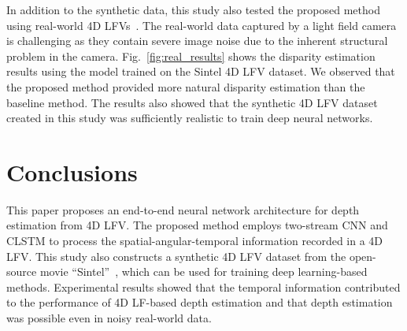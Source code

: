 \documentclass[]{spie}
\newcommand{\jtextd}[1]{}
\begin{document}
In addition to
the synthetic data, 
this study also tested the proposed method using real-world 4D LFVs~\cite{wang2017light}.
The real-world data captured by a light field camera is challenging
as they contain severe image noise due to 
the inherent structural problem in the camera.
Fig.~\ref{fig:real_results} shows the disparity estimation results
using the model trained on the Sintel 4D LFV dataset. 
We observed that the proposed method provided more natural 
disparity estimation
than the baseline method.
The results also showed
that the synthetic 4D LFV dataset 
created in this study was sufficiently realistic to train deep neural networks.



\section{Conclusions}
\jtextd{
   4D LFVsから奥行きを推定するためのエンドツーエンドの
   ニューラルネットワークアーキテクチャを提案した．
   提案手法は，2ストリームCNNとCLSTMを使用して，
   4D LFVsに記録された空間-角度-時間情報を処理することができる．
また，深層学習モデルを十分にトレーニング可能な規模の
   4D LFVsデータセットが存在しないため，
   オープンソースの映画``Sintel''
   を使用し，中規模4D LFVsデータセットを作成した．
実験結果は，時間情報が4D LFベースの奥行き推定性能を
   向上させることを示しており，
   ノイズの多い実世界データにおいても奥行き推定が
   可能であることを示している．
}

This paper proposes an end-to-end neural network architecture 
for depth estimation from 4D LFV.
The proposed method employs two-stream CNN and CLSTM to process 
the spatial-angular-temporal information recorded in a 4D LFV.
This study also constructs a synthetic 4D LFV dataset 
from the open-source movie ``Sintel''~\cite{sintel2010},
which can be used for training deep learning-based methods. 
Experimental results showed that the temporal information contributed to 
the performance of 4D LF-based depth estimation
and that depth estimation was possible even in noisy real-world data.
\end{document}
